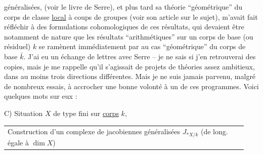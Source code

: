 généralisées,  (voir le livre de Serre), et plus tard sa théorie ``géométrique'' du corps de classe \uline{local} à coups de groupes  (voir son article sur le sujet), m'avait fait réfléchir à des formulations cohomologiques de ces résultats, qui devaient être notamment de nature  que les résultats ``arithmétiques'' sur un corps de base (ou résiduel) $k$  se ramènent immédiatement par  au cas ``géométrique'' du corps de base $\bar{k}$. J'ai eu un échange de lettres avec Serre -- je ne sais si j'en retrouverai des copies, mais je me rappelle qu'il s'agissait de projets de théories assez ambitieux,  dans au moins trois directions différentes. Mais je ne suis jamais parvenu, malgré de nombreux essais, à accrocher une bonne volonté à un de ces programmes. Voici quelques mots sur eux :

C) Situation $X$ de type fini sur \uline{corps} $k$,

\noindent\begin{tabular}{@{}|p{0.94\linewidth}@{}}
Construction d'un complexe de jacobiennes généralisées $J_{*X/k}$ (de long. égale à $\dim X$)
\end{tabular}
